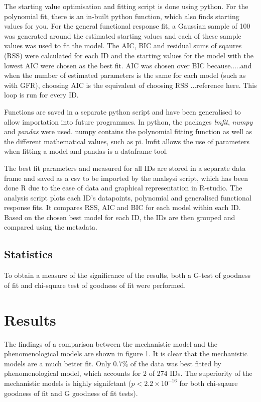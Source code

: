\documentclass[11pt, a4paper, titlepage]{article}
\begin{document}
The starting value optimisation and fitting script is done using python. For the polynomial fit, there is an in-built python function, which also finds starting values for you. For the general functional response fit, a Gaussian sample of 100 was generated around the estimated starting values and each of these sample values was used to fit the model. The AIC, BIC and residual sums of sqaures (RSS) were calculated for each ID and the starting values for the model with the lowest AIC were chosen as the best fit. AIC was chosen over BIC because.....and when the number of estimated parameters is the same for each model (such as with GFR), choosing AIC is the equivalent of choosing RSS ...reference here. This loop is run for every ID.

Functions are saved in a separate python script and have been generalised to allow importation into future programmes. In python, the packages \textit{lmfit}, \textit{numpy} and \textit{pandas} were used. numpy contains the polynomial fitting function as well as the different mathematical values, such as pi. lmfit allows the use of parameters when fitting a model and pandas is a dataframe tool.

The best fit parameters and measured for all IDs are stored in a separate data frame and saved as a csv to be imported by the analsysi script, which has been done R due to the ease of data and graphical representation in R-studio. The analysis script plots each ID's datapoints, polynomial and generalised functional response fits. It compares RSS, AIC and BIC for each model within each ID. Based on the chosen best model for each ID, the IDs are then grouped and compared using the metadata.

\subsection{Statistics}

To obtain a measure of the significance of the results, both a G-test of goodness of fit and chi-square test of goodness of fit were performed.

\section{Results}

The findings of a comparison between the mechanistic model and the phenomenological models are shown in figure 1. It is clear that the mechanistic models are a much better fit. Only 0.7\% of the data was best fitted by phenomenological model, which accounts for 2 of 274 IDs. The superiority of the mechanistic models is highly signifctant ($p < 2.2\times10^{-16}$ for both chi-sqaure goodness of fit and G goodness of fit tests). 
\end{document}
